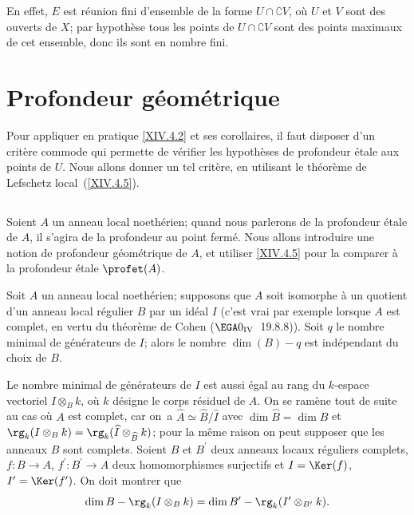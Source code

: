 En effet, $E$ est r\'eunion fini d'ensemble de la forme $U\cap\complement V$, o\`u $U$ et $V$ sont des ouverts de $X$; par hypoth\`ese tous les points de $U\cap\complement V$ sont des points maximaux de cet ensemble, donc ils sont en nombre fini.

\section{Profondeur g\'eom\'etrique} \label{XIV.5}

Pour appliquer en pratique \ref{XIV.4.2} et ses corollaires, il faut disposer d'un crit\`ere commode qui permette de v\'erifier les hypoth\`eses de profondeur \'etale aux points de $U$. Nous allons donner un tel crit\`ere, en utilisant le th\'eor\`eme de Lefschetz local~(\ref{XIV.4.5}).

\subsection{} \label{XIV.5.1} Soient $A$ un anneau local noeth\'erien; quand nous parlerons de la profondeur \'etale de $A$, il s'agira de la profondeur au point ferm\'e. Nous allons introduire une notion de \og profondeur g\'eom\'etrique de $A$\fg, et utiliser \ref{XIV.4.5} pour la comparer \`a la profondeur \'etale $\profet(A)$.

\begin{proposition} \label{XIV.5.2} Soit $A$ un anneau local noeth\'erien; supposons que $A$ soit isomorphe \`a un quotient d'un anneau local r\'egulier $B$ par un id\'eal $I$ (c'est vrai par exemple lorsque $A$ est complet, en vertu du th\'eor\`eme de Cohen (\textup{$\EGA 0_{\textup{IV}}$~19.8.8})). Soit $q$ le nombre minimal de g\'en\'erateurs de $I$; alors le nombre $\dim(B)-q$ est ind\'ependant du choix de $B$.
\end{proposition}

Le nombre minimal de g\'en\'erateurs de $I$ est aussi \'egal au rang du $k$-espace vectoriel $I\otimes_{B}k$, o\`u $k$ d\'esigne le corps r\'esiduel de $A$. On se ram\`ene tout de suite au cas o\`u $A$ est complet, car on~a $\widehat{A}\simeq\widehat{B}/\widehat{I}$ avec $\dim \widehat{B}=\dim B$ et $\rg_{k}(I\otimes_{B}k)=\rg_{k}(\widehat{I}\otimes_{\widehat{B}}k)$; pour la m\^eme raison on peut supposer que les anneaux $B$ sont complets. Soient $B$ et $B^{\prime}$ deux anneaux locaux r\'eguliers complets, $f\colon B\to A$, $f^{\prime}\colon B^{\prime}\to A$ deux homomorphismes surjectifs et $I=\Ker(f)$, $I^{\prime}=\Ker(f^{\prime})$. On doit montrer que
$$
\dim B-\rg_{k}(I\otimes_{B}k)=\dim B^{\prime}-\rg_{k}(I^{\prime}\otimes_{B^{\prime}}k).
$$

